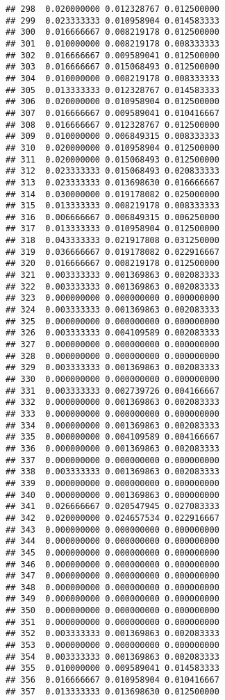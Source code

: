 \documentclass[
]{article}
\begin{document}
\begin{verbatim}
## 298  0.020000000 0.012328767 0.012500000
## 299  0.023333333 0.010958904 0.014583333
## 300  0.016666667 0.008219178 0.012500000
## 301  0.010000000 0.008219178 0.008333333
## 302  0.016666667 0.009589041 0.012500000
## 303  0.016666667 0.015068493 0.012500000
## 304  0.010000000 0.008219178 0.008333333
## 305  0.013333333 0.012328767 0.014583333
## 306  0.020000000 0.010958904 0.012500000
## 307  0.016666667 0.009589041 0.010416667
## 308  0.016666667 0.012328767 0.012500000
## 309  0.010000000 0.006849315 0.008333333
## 310  0.020000000 0.010958904 0.012500000
## 311  0.020000000 0.015068493 0.012500000
## 312  0.023333333 0.015068493 0.020833333
## 313  0.023333333 0.013698630 0.016666667
## 314  0.030000000 0.019178082 0.025000000
## 315  0.013333333 0.008219178 0.008333333
## 316  0.006666667 0.006849315 0.006250000
## 317  0.013333333 0.010958904 0.012500000
## 318  0.043333333 0.021917808 0.031250000
## 319  0.036666667 0.019178082 0.022916667
## 320  0.016666667 0.008219178 0.012500000
## 321  0.003333333 0.001369863 0.002083333
## 322  0.003333333 0.001369863 0.002083333
## 323  0.000000000 0.000000000 0.000000000
## 324  0.003333333 0.001369863 0.002083333
## 325  0.000000000 0.000000000 0.000000000
## 326  0.003333333 0.004109589 0.002083333
## 327  0.000000000 0.000000000 0.000000000
## 328  0.000000000 0.000000000 0.000000000
## 329  0.003333333 0.001369863 0.002083333
## 330  0.000000000 0.000000000 0.000000000
## 331  0.003333333 0.002739726 0.004166667
## 332  0.000000000 0.001369863 0.002083333
## 333  0.000000000 0.000000000 0.000000000
## 334  0.000000000 0.001369863 0.002083333
## 335  0.000000000 0.004109589 0.004166667
## 336  0.000000000 0.001369863 0.002083333
## 337  0.000000000 0.000000000 0.000000000
## 338  0.003333333 0.001369863 0.002083333
## 339  0.000000000 0.000000000 0.000000000
## 340  0.000000000 0.001369863 0.000000000
## 341  0.026666667 0.020547945 0.027083333
## 342  0.020000000 0.024657534 0.022916667
## 343  0.000000000 0.000000000 0.000000000
## 344  0.000000000 0.000000000 0.000000000
## 345  0.000000000 0.000000000 0.000000000
## 346  0.000000000 0.000000000 0.000000000
## 347  0.000000000 0.000000000 0.000000000
## 348  0.000000000 0.000000000 0.000000000
## 349  0.000000000 0.000000000 0.000000000
## 350  0.000000000 0.000000000 0.000000000
## 351  0.000000000 0.000000000 0.000000000
## 352  0.003333333 0.001369863 0.002083333
## 353  0.000000000 0.000000000 0.000000000
## 354  0.003333333 0.001369863 0.002083333
## 355  0.010000000 0.009589041 0.014583333
## 356  0.016666667 0.010958904 0.010416667
## 357  0.013333333 0.013698630 0.012500000

\end{verbatim}
\end{document}
